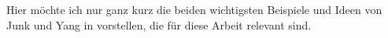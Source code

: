 Hier möchte ich nur ganz kurz die beiden wichtigsten Beispiele und Ideen von Junk und Yang in \cite{Junk2004} vorstellen, die für diese Arbeit relevant sind.
